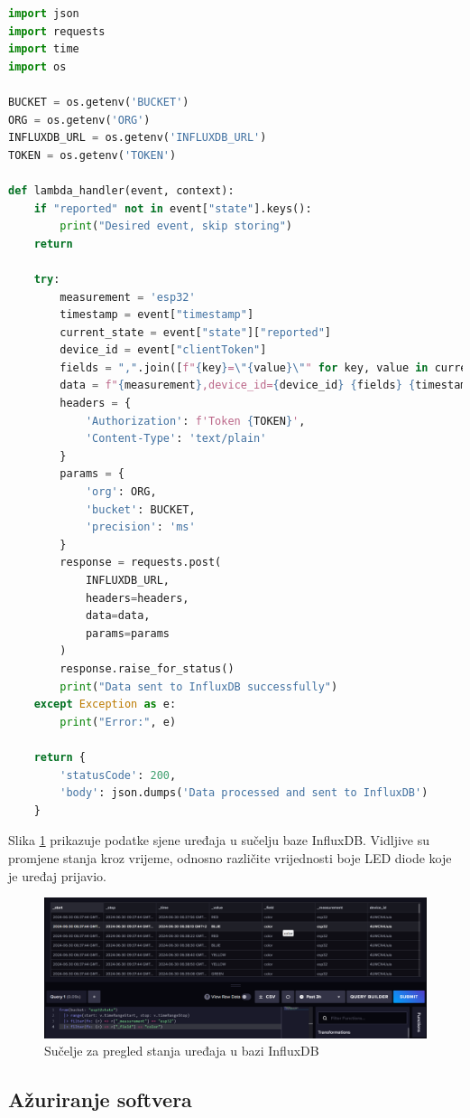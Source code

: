\begin{lstlisting}[caption={Lambda funkcija za preusmjeravanje poruka sjene uređaja}, language=python]
import json
import requests
import time
import os

BUCKET = os.getenv('BUCKET')
ORG = os.getenv('ORG')
INFLUXDB_URL = os.getenv('INFLUXDB_URL')
TOKEN = os.getenv('TOKEN')

def lambda_handler(event, context):
	if "reported" not in event["state"].keys():
		print("Desired event, skip storing")
	return
	
	try:
		measurement = 'esp32'
		timestamp = event["timestamp"]
		current_state = event["state"]["reported"]
		device_id = event["clientToken"]
		fields = ",".join([f"{key}=\"{value}\"" for key, value in current_state.items() if key != "timestamp" and key != "clientToken"])
		data = f"{measurement},device_id={device_id} {fields} {timestamp * 1000}"
		headers = {
			'Authorization': f'Token {TOKEN}',
			'Content-Type': 'text/plain'
		}
		params = {
			'org': ORG,
			'bucket': BUCKET,
			'precision': 'ms'
		}
		response = requests.post(
			INFLUXDB_URL,
			headers=headers,
			data=data,
			params=params
		)
		response.raise_for_status()
		print("Data sent to InfluxDB successfully")
	except Exception as e:
		print("Error:", e)
	
	return {
		'statusCode': 200,
		'body': json.dumps('Data processed and sent to InfluxDB')
	}
\end{lstlisting}

Slika \ref{fig:influxdb_state} prikazuje podatke sjene uređaja u sučelju baze InfluxDB. Vidljive su promjene stanja kroz vrijeme, odnosno različite vrijednosti boje LED diode koje je uređaj prijavio. 

\begin{figure}[ht]
	\centering
	\includegraphics[scale=0.4]{imgs/influxdb_state}
	\caption{Sučelje za pregled stanja uređaja u bazi InfluxDB}
	\label{fig:influxdb_state}
\end{figure}

\subsection{Ažuriranje softvera}
